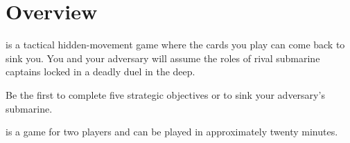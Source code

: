 \section*{Overview}
\PING{} is a tactical hidden-movement game where the cards you play can come back to sink you. You and your adversary will assume the roles of rival submarine captains locked in a deadly duel in the deep.

Be the first to complete five strategic objectives or to sink your adversary's submarine.

\PING{} is a game for two players and can be played in approximately twenty minutes.
